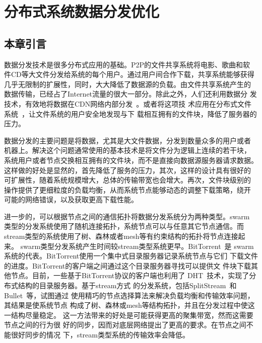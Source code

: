 \chapter{分布式系统数据分发优化}
\label{chap:bt}

\section{本章引言}


数据分发技术是很多分布式应用的基础。P2P的文件共享系统将电影、歌曲和软
件CD等大文件分发给系统的每个用户。通过用户间合作下载，共享系统能够获得
几乎无限制的扩展性，同时，大大降低了数据源的负载。由文件共享系统产生的
数据传输，已经占了Internet流量的很大一部分。除此之外，人们还利用数据分
发技术，有效地将数据在CDN网络内部分发~\cite{fastreplica}。或者将这项技
术应用在分布式文件系统~\cite{sharkfs}，让文件系统的用户安全地发现与下
载相互拥有的文件块，降低了服务器的压力。

数据分发的主要问题是将数据，尤其是大文件数据，分发到数量众多的用户或者
机器上。解决这个问题通常使用的基本技术是将文件分为逻辑上连续的若干块，
系统用户或者节点交换相互拥有的文件块，而不是直接向数据源服务器请求数据。
这样做的好处是显然的，首先降低了服务的压力，其次，这样的设计具有很好的
可扩展性，随着系统规模增大，总体的传输带宽也会增大。再次，文件块级别的
操作提供了更细粒度的负载均衡，从而系统节点能够动态的调整下载策略，绕开
可能的网络错误，以及获取更高下载性能。

进一步的，可以根据节点之间的通信拓扑将数据分发系统分为两种类型。swarm
类型的分发系统使用了随机连接拓扑，系统节点可以与任意其它节点通信。而
stream类型的系统使用了树、森林或者mesh等有约束结构的拓扑将节点连接起来。
swarm类型分发系统产生时间较stream类型系统更早。BitTorrent~\cite{bt}是
swarm系统的代表。BitTorrent使用一个集中式目录服务器记录系统节点与它们
下载文件的进度。BitTorrent的客户端之间通过这个目录服务器寻找可以提供文
件块下载其他节点。目前，一些基于BitTorrent协议的客户端也利用了
DHT~\cite{cademlia}技术，实现了分布式结构的目录服务器。基于stream方式
的分发系统，包括SplitStream~\cite{xxx}和Bullet~\cite{xxx}等，试图通过
使用精巧的节点选择算法来解决负载均衡和传输效率问题，其结果是使系统节点
构成了树、森林或mesh等结构拓扑，并且在分发过程中使这一结构尽量稳定。
这一方法带来的好处是可能获得更高的聚集带宽，然而这需要节点之间的行为很
好的同步，因而对底层网络提出了更高的要求。在节点之间不能很好同步的情况
下，stream类型系统的传输效率会降低。

